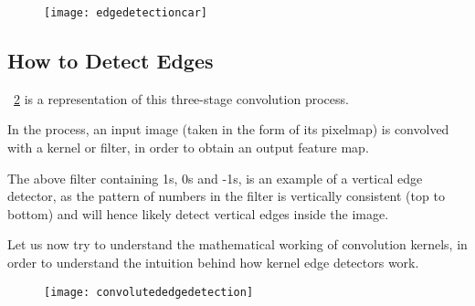 	\begin{figure}[h]
		\centering
		\texttt{[image: edgedetectioncar]}
		\caption{}
		\label{fig:edgedetectioncar}
	\end{figure}

	\subsection{How to Detect Edges}

	\begin{bulletedlist}
		\item \figurename~\ref{fig:convolutededgedetection} is a representation of this three-stage convolution process.
		\item In the process, an input image (taken in the form of its pixelmap) is convolved with a kernel or filter, 	in order to obtain an output feature map.
		\item The above filter containing 1s, 0s and -1s, is an example of a vertical edge detector, as the pattern of numbers in the filter is vertically consistent (top to bottom) and will hence likely detect vertical edges inside the image.
		\item Let us now try to understand the mathematical working of convolution kernels, in order to understand the intuition behind how kernel edge detectors work.
	\end{bulletedlist}

	\begin{figure}[h]
		\centering
		\texttt{[image: convolutededgedetection]}
		\caption{}
		\label{fig:convolutededgedetection}
	\end{figure}

